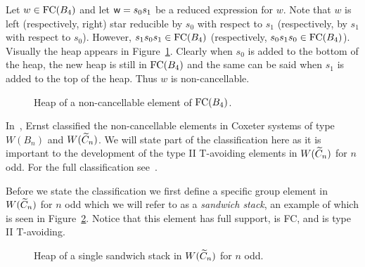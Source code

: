 \begin{example}
Let $w \in \mathrm{FC}(B_4)$ and let $\mathsf{w}=s_0s_1$ be a reduced expression for $w$. Note that $w$ is left (respectively, right) star reducible by $s_0$ with respect to $s_1$ (respectively, by $s_1$ with respect to $s_0$). However, $s_1s_0s_1 \in \mathrm{FC}(B_4)$ (respectively, $s_0s_1s_0 \in \mathrm{FC}(B_4)$).  Visually the heap appears in Figure~\ref{fig:noncancelvisual}. Clearly when $s_0$ is added to the bottom of the heap, the new heap is still in $\mathrm{FC}(B_4)$ and the same can be said when $s_1$ is added to the top of the heap. Thus $w$ is non-cancellable.
\end{example}

\begin{figure*}[h!] \centering
{}	
\caption{Heap of a non-cancellable element of $\mathrm{FC}(B_4)$.}\label{fig:noncancelvisual}
\end{figure*}

In~\cite{Ernst2010}, Ernst classified the non-cancellable elements in Coxeter systems of type $W(B_n)$ and $W(\widetilde{C}_n)$. We will state part of the classification here as it is important to the development of the type II T-avoiding elements in $W(\widetilde{C}_n)$ for $n$ odd. For the full classification see~\cite[Sections 4.2 and 5]{Ernst2010}. 

Before we state the classification we first define a specific group element in $W(\widetilde{C}_n)$ for $n$ odd which we will refer to as a \emph{sandwich stack}, an example of which is seen in Figure~\ref{fig:singsandstack}. Notice that this element has full support, is FC, and is type II T-avoiding.

\begin{figure}[h!] \centering
{}
\caption{Heap of a single sandwich stack in $W(\widetilde{C}_n)$ for $n$ odd.}\label{fig:singsandstack}
\end{figure}

